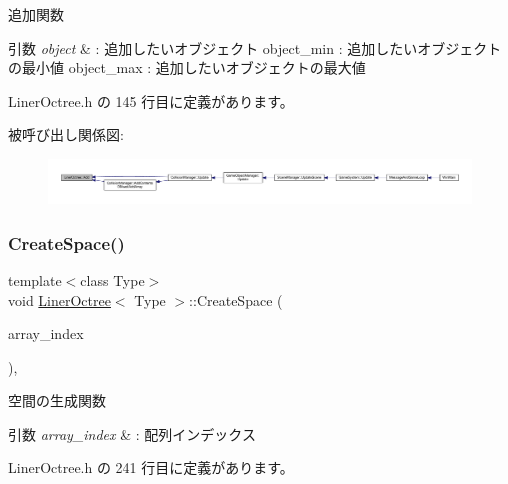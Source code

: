 追加関数 


\begin{DoxyParams}{引数}
{\em object} & \+: 追加したいオブジェクト object\+\_\+min \+: 追加したいオブジェクトの最小値 object\+\_\+max \+: 追加したいオブジェクトの最大値 \\
\hline
\end{DoxyParams}


 Liner\+Octree.\+h の 145 行目に定義があります。

被呼び出し関係図\+:
\nopagebreak
\begin{figure}[H]
\begin{center}
\leavevmode
\includegraphics[width=350pt]{class_liner_octree_ac5773a5193942a68f77a33baed9d69d4_icgraph}
\end{center}
\end{figure}
\mbox{\label{class_liner_octree_a62aa42a787a399c3651bac3bbef8f1a6}} 
\subsubsection{\texorpdfstring{Create\+Space()}{CreateSpace()}}
{\footnotesize\ttfamily template$<$class Type$>$ \\
void \mbox{\hyperlink{class_liner_octree}{Liner\+Octree}}$<$ Type $>$\+::Create\+Space (\begin{DoxyParamCaption}\item[{D\+W\+O\+RD}]{array\+\_\+index }\end{DoxyParamCaption})\hspace{0.3cm}{\ttfamily [inline]}, {\ttfamily [private]}}



空間の生成関数 


\begin{DoxyParams}{引数}
{\em array\+\_\+index} & \+: 配列インデックス \\
\hline
\end{DoxyParams}


 Liner\+Octree.\+h の 241 行目に定義があります。

